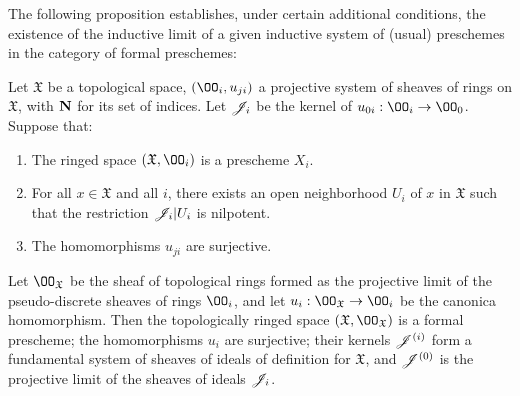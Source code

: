 The following proposition establishes, under certain additional conditions, the existence of the inductive limit of a given inductive system of (usual) preschemes in the category of formal preschemes:
\begin{prop}[10.6.3]
\label{1.10.6.3}
Let $\mathfrak{X}$ be a topological space, $(\OO_i,u_{ji})$ a projective system of sheaves of rings on $\mathfrak{X}$, with $\mathbf{N}$ for its set of indices.
Let $\mathscr{J}_i$ be the kernel of $u_{0i}:\OO_i\to\OO_0$.
Suppose that:
\begin{enumerate}[label=\emph{(\alph*)}]
  \item The ringed space $(\mathfrak{X},\OO_i)$ is a prescheme $X_i$.
  \item For all $x\in\mathfrak{X}$ and all $i$, there exists an open neighborhood $U_i$ of $x$ in $\mathfrak{X}$ such that the restriction $\mathscr{J}_i|U_i$ is nilpotent.
  \item The homomorphisms $u_{ji}$ are surjective.
\end{enumerate}

Let $\OO_\mathfrak{X}$ be the sheaf of topological rings formed as the projective limit of the pseudo-discrete sheaves of rings $\OO_i$, and let $u_i:\OO_\mathfrak{X}\to\OO_i$ be the canonica homomorphism.
Then the topologically ringed space $(\mathfrak{X},\OO_\mathfrak{X})$ is a formal prescheme; the homomorphisms $u_i$ are surjective; their kernels $\mathscr{J}^{(i)}$ form a fundamental system of sheaves of ideals of definition for $\mathfrak{X}$, and $\mathscr{J}^{(0)}$ is the projective limit of the sheaves of ideals $\mathscr{J}_i$.
\end{prop}

